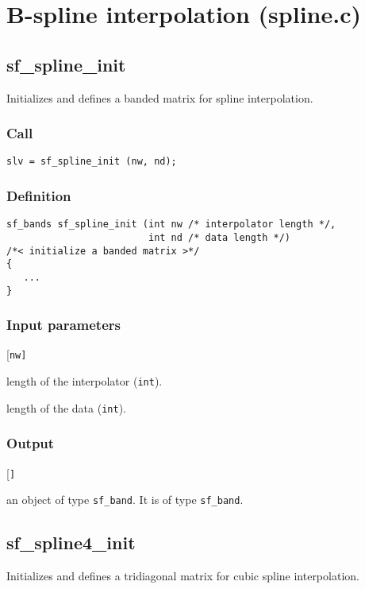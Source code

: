 \section{B-spline interpolation (spline.c)}




\subsection{{sf\_spline\_init}}
Initializes and defines a banded matrix for spline interpolation.


\subsubsection*{Call}
\begin{verbatim}slv = sf_spline_init (nw, nd);\end{verbatim}


\subsubsection*{Definition}
\begin{verbatim}
sf_bands sf_spline_init (int nw /* interpolator length */, 
                         int nd /* data length */)
/*< initialize a banded matrix >*/
{
   ...
}
\end{verbatim}


\subsubsection*{Input parameters}
\begin{desclist}{\tt }{\quad}[\tt nw]
   \setlength\itemsep{0pt}
   \item[nw] length of the interpolator (\texttt{int}). 
   \item[nd] length of the data (\texttt{int}).  
\end{desclist}

\subsubsection*{Output}
\begin{desclist}{\tt }{\quad}[\tt ]
   \setlength\itemsep{0pt}
   \item[slv] an object of type \texttt{sf\_band}. It is of type \texttt{sf\_band}.
\end{desclist}



\subsection{{sf\_spline4\_init}}
Initializes and defines a tridiagonal matrix for cubic spline interpolation.

